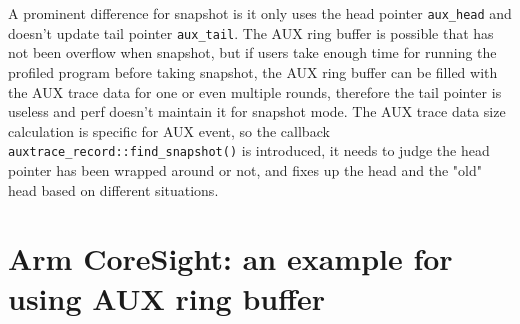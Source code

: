 \documentclass[11pt]{diazessay} %
\def\code#1{\texttt{#1}}
\begin{document}
A prominent difference for snapshot is it only uses the head pointer \code{aux\_head} and doesn't update tail pointer \code{aux\_tail}.  The AUX ring buffer is possible that has not been overflow when snapshot, but if users take enough time for running the profiled program before taking snapshot, the AUX ring buffer can be filled with the AUX trace data for one or even multiple rounds, therefore the tail pointer is useless and perf doesn't maintain it for snapshot mode.  The AUX trace data size calculation is specific for AUX event, so the callback \code{auxtrace\_record::find\_snapshot()} is introduced, it needs to judge the head pointer has been wrapped around or not, and fixes up the head and the "old" head based on different situations.

\section*{Arm CoreSight: an example for using AUX ring buffer}
\end{document}
